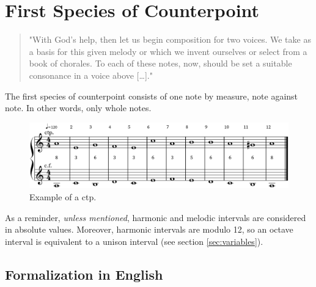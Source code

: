 \chapter{First Species of Counterpoint}

\begin{quotation}
    "With God's help, then let us begin composition for two voices. We take as a basis for this given melody or \cfcomma which we invent ourselves or select from a book of chorales. To each of these notes, now, should be set a suitable consonance in a voice above [\dots]."
    \textcite[p.27]{GaPEng}
\end{quotation}

The first species of counterpoint consists of one note by measure, note against note. In other words, only whole notes.
\begin{figure}[h]
    \centering
    \includegraphics[height=\fhl]{Images/the_first_species.png}
    \caption{Example of a  ctp.  }
\end{figure}

As a reminder, \textit{unless mentioned}, harmonic and melodic intervals are considered in absolute values. Moreover, harmonic intervals are modulo 12, so an octave interval is equivalent to a unison interval (see section \ref{sec:variables}).

\section{Formalization in English} \label{subsec:1SPEnglish}

